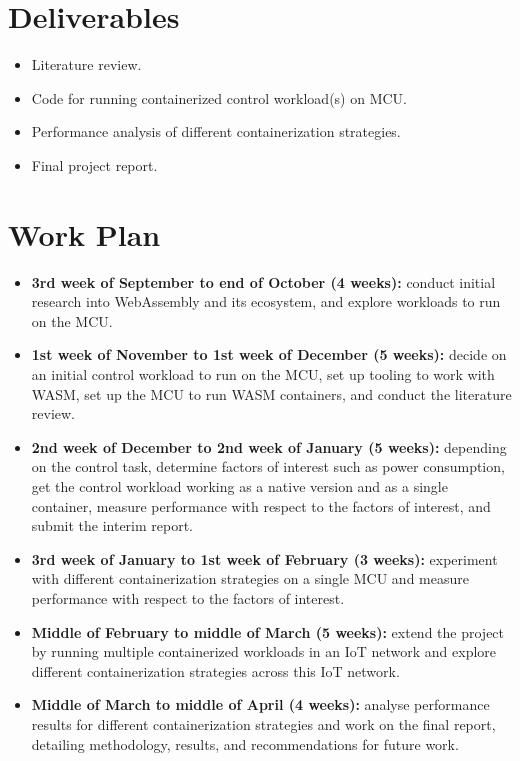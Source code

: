 \documentclass[12pt, a4paper]{report}
\begin{document}
\section*{Deliverables}
\begin{itemize}
    \item Literature review.
    \item Code for running containerized control workload(s) on MCU.
    \item Performance analysis of different containerization strategies.
    \item Final project report.
\end{itemize}

\section*{Work Plan}
\begin{itemize}
    \item \textbf{3rd week of September to end of October (4 weeks):} conduct initial research into WebAssembly and its ecosystem, and explore workloads to run on the MCU.
    \item \textbf{1st week of November to 1st week of December (5 weeks):} decide on an initial control workload to run on the MCU, set up tooling to work with WASM, set up the MCU to run WASM containers, and conduct the literature review.
    \item \textbf{2nd week of December to 2nd week of January (5 weeks):} depending on the control task, determine factors of interest such as power consumption, get the control workload working as a native version and as a single container, measure performance with respect to the factors of interest, and submit the interim report.
    \item \textbf{3rd week of January to 1st week of February (3 weeks):} experiment with different containerization strategies on a single MCU and measure performance with respect to the factors of interest.
    \item \textbf{Middle of February to middle of March (5 weeks):} extend the project by running multiple containerized workloads in an IoT network and explore different containerization strategies across this IoT network.
    \item \textbf{Middle of March to middle of April (4 weeks):} analyse performance results for different containerization strategies and work on the final report, detailing methodology, results, and recommendations for future work.
\end{itemize}
\end{document}
